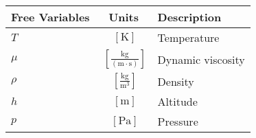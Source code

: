 \documentclass[12pt]{article}
\begin{document}
{\footnotesize
\begin{longtable}{lcl}
\toprule
Free Variables & Units & Description \\ \midrule
$T$ & $~\mathrm{[K]}$ & Temperature \\
$\mu$ & $~\mathrm{[\tfrac{kg}{\left(m\cdot s\right)}]}$ & Dynamic viscosity \\
$\rho$ & $~\mathrm{[\tfrac{kg}{m^{3}}]}$ & Density \\
$h$ & $~\mathrm{[m]}$ & Altitude \\
$p$ & $~\mathrm{[Pa]}$ & Pressure \\
\bottomrule
\end{longtable}}

 
\end{document}
